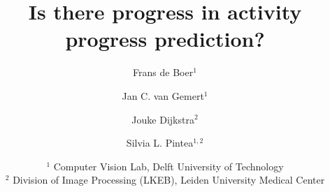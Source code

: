\documentclass[10pt,twocolumn,letterpaper]{article}
\begin{document}


\title{Is there progress in activity progress prediction?}

\author{Frans de Boer$^1$\\
\and
Jan C. van Gemert$^1$\\
\and
Jouke Dijkstra$^2$\\
\and
Silvia L. Pintea$^{1,2}$\\
\and
{\normalsize $^{1}$ Computer Vision Lab, Delft University of Technology}\\
{\normalsize $^{2}$ Division of Image Processing (LKEB), Leiden University Medical Center}\\
}

\maketitle
\ificcvfinal\thispagestyle{empty}\fi










{\small


}

\appendix

\end{document}
